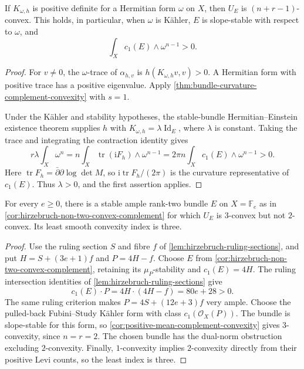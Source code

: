 \begin{corollary}\label{cor:positive-mean-complement-convexity}
If $K_{\omega,h}$ is positive definite for a Hermitian form $\omega$ on $X$, then $U_E$ is $(n+r-1)$-convex. This holds, in particular, when $\omega$ is K\"ahler, $E$ is slope-stable with respect to $\omega$, and
\[
 \int_Xc_1(E)\wedge\omega^{n-1}>0.
\]
\end{corollary}
\begin{proof}
For $v\ne0$, the $\omega$-trace of $\alpha_{h,v}$ is $h(K_{\omega,h}v,v)>0$. A Hermitian form with positive trace has a positive eigenvalue. Apply \cref{thm:bundle-curvature-complement-convexity} with $s=1$.

Under the K\"ahler and stability hypotheses, the stable-bundle Hermitian--Einstein existence theorem supplies $h$ with $K_{\omega,h}=\lambda\operatorname{Id}_E$, where $\lambda$ is constant. Taking the trace and integrating the contraction identity gives
\[
 r\lambda\int_X\omega^n
 =n\int_X\operatorname{tr}(\mathrm iF_h)\wedge\omega^{n-1}
 =2\pi n\int_Xc_1(E)\wedge\omega^{n-1}>0.
\]
Here $\operatorname{tr}F_h=\bar\partial\partial\log\det M$, so $\mathrm i\operatorname{tr}F_h/(2\pi)$ is the curvature representative of $c_1(E)$. Thus $\lambda>0$, and the first assertion applies.
\end{proof}

\begin{corollary}\label{cor:hirzebruch-exact-complement-index}
For every $e\geq0$, there is a stable ample rank-two bundle $E$ on $X=\mathbb F_e$ as in \cref{cor:hirzebruch-non-two-convex-complement} for which $U_E$ is $3$-convex but not $2$-convex. Its least smooth convexity index is three.
\end{corollary}
\begin{proof}
Use the ruling section $S$ and fibre $f$ of \cref{lem:hirzebruch-ruling-sections}, and put $H=S+(3e+1)f$ and $P=4H-f$. Choose $E$ from \cref{cor:hirzebruch-non-two-convex-complement}, retaining its $\mu_P$-stability and $c_1(E)=4H$. The ruling intersection identities of \cref{lem:hirzebruch-ruling-sections} give
\[
 c_1(E)\cdot P=4H\cdot(4H-f)=80e+28>0.
\]
The same ruling criterion makes $P=4S+(12e+3)f$ very ample. Choose the pulled-back Fubini--Study K\"ahler form with class $c_1(\mathcal O_X(P))$. The bundle is slope-stable for this form, so \cref{cor:positive-mean-complement-convexity} gives $3$-convexity, since $n=r=2$. The chosen bundle has the dual-norm obstruction excluding $2$-convexity. Finally, $1$-convexity implies $2$-convexity directly from their positive Levi counts, so the least index is three.
\end{proof}
